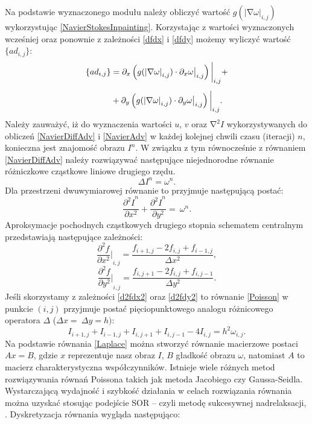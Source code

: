 \documentclass[12pt, twoside, openany]{report}
\theoremstyle{definition}
\begin{document}
Na podstawie wyznaczonego modułu należy obliczyć wartość $g{\left({\left|\mathrm{\nabla }\omega \right|}_{i,j}\right)}$ wykorzystując \eqref{NavierStokesInpainting}. Korzystając z wartości wyznaczonych wcześniej oraz ponownie z zależności \eqref{dfdx} i \eqref{dfdy} możemy wyliczyć wartość $\{ad_{i,j}\} $:
\begin{align}
\{ad_{i,j}\} &= \partial_x \left( g(\left| \nabla\omega \right|_{i,j}) \cdot \partial_x \omega \big|_{i,j} \right) \bigg|_{i,j} \notag +\\[1ex]
&+ \partial_y \left( g(\left|\nabla\omega\right|_{i,j}) \cdot \partial_y \omega \big|_{i,j} \right)\bigg|_{i,j}.
\label{discreteAnisotropic}
\end{align}
Należy zauważyć, iż do wyznaczenia wartości $u$, $v$ oraz ${\mathrm{\nabla }}^2I$ wykorzystywanych do obliczeń \eqref{NavierDiffAdv} i \eqref{NavierAdv} w każdej kolejnej chwili czasu (iteracji) $n$, konieczna jest znajomość obrazu $I^n$. W związku z tym równocześnie z równaniem \eqref{NavierDiffAdv} należy rozwiązywać następujące niejednorodne równanie różniczkowe cząstkowe liniowe drugiego rzędu.
\begin{equation}
\Delta I^n={\omega }^n
\label{Poisson}
.
\end{equation}
Dla przestrzeni dwuwymiarowej równanie to przyjmuje następującą postać:
\begin{equation}
\frac{{{\partial }^2I}^n}{\partial x^2}+\frac{{{\partial }^2I}^n}{\partial y^2}=\ \omega^n
\label{Poisson2D}
.
\end{equation}
Aproksymacje pochodnych cząstkowych drugiego stopnia schematem centralnym przedstawiają następujące zależności:
\begin{equation}
{\frac{{\partial }^2f}{\partial x^2}\bigg|}_{i,j}\mathrm{=}\frac{f_{i+1,j}-2f_{i,j}+f_{i-1,j}}{\Delta x^2}
\label{d2fdx2}
,
\end{equation}
\begin{equation}
{\frac{{\partial }^2f}{\partial y^2}\bigg|}_{i,j}\mathrm{=}\frac{f_{i,j+1}-2f_{i,j}+f_{i,j-1}}{\Delta y^2}
\label{d2fdy2}
.
\end{equation}
Jeśli skorzystamy z zależności \eqref{d2fdx2} oraz \eqref{d2fdy2} to równanie \eqref{Poisson} w punkcie $(i,j)$ przyjmuje postać pięciopunktowego analogu różnicowego operatora $\Delta $ ($\Delta x=\ \Delta y=h)$:
\begin{equation}
I_{i+1,j}+I_{i-1,j}+I_{i,j+1}+I_{i,j-1}-4I_{i,j}=h^2{\omega }_{i,j}
\label{Laplace}
.
\end{equation}
Na podstawie równania \eqref{Laplace} można stworzyć równanie macierzowe postaci $Ax=B$, gdzie $x$ reprezentuje nasz obraz $I$, $B$ gładkość obrazu $\omega$, natomiast $A$ to macierz charakterystyczna współczynników. Istnieje wiele różnych metod rozwiązywania równań Poissona takich jak metoda Jacobiego czy Gaussa-Seidla.  Wystarczającą wydajność i szybkość działania w celach rozwiązania równania można uzyskać stosując podejście SOR – czyli metodę sukcesywnej nadrelaksacji, \cite{blacksuccessive}. Dyskretyzacja równania wygląda następująco:
\end{document}
